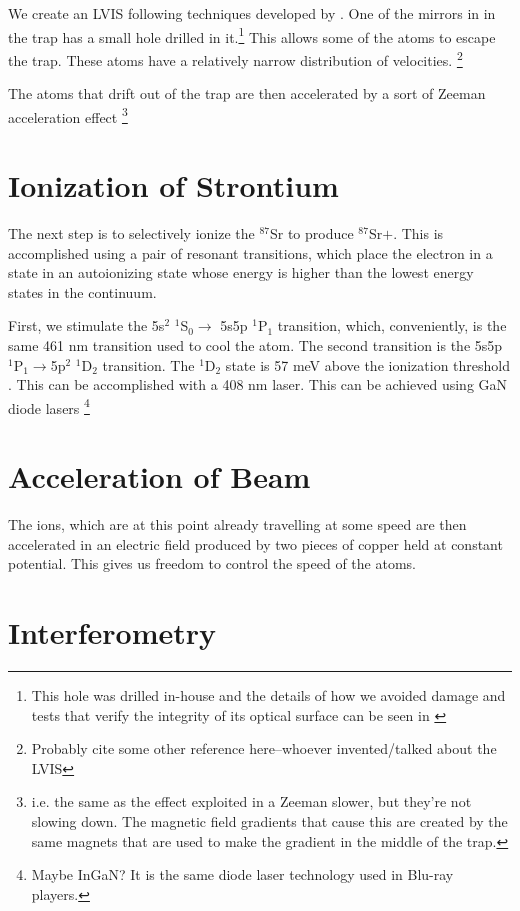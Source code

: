 We create an LVIS \cite{cjeDiss} following techniques developed by \cite{LVIS}. One of the mirrors in in the trap has a small hole drilled in it.\footnote{This hole was drilled in-house and the details of how we avoided damage and tests that verify the integrity of its optical surface can be seen in \cite{cjeDiss}} This allows some of the atoms to escape the trap. These atoms have a relatively narrow distribution of velocities. \footnote{Probably cite some other reference here--whoever invented/talked about the LVIS}

The atoms that drift out of the trap are then accelerated by a sort of Zeeman acceleration effect \footnote{i.e. the same as the effect exploited in a Zeeman slower, but they're not slowing down. The magnetic field gradients that cause this are created by the same magnets that are used to make the gradient in the middle of the trap.}

\section{Ionization of Strontium}
 
The next step is to selectively ionize the $^{87}$Sr to produce $^{87}$Sr$+$. This is accomplished using a pair of resonant transitions, which place the electron in a state in an autoionizing state whose energy is higher than the lowest energy states in the continuum. 

First, we stimulate the 5s$^2$ $^1$S$_0 \rightarrow$ 5s5p $^1$P$_1$ transition, which, conveniently, is the same 461 nm transition used to cool the atom. The second transition is the 5s5p $^1$P$_1\rightarrow$5p$^2$ $^1$D$_2$ transition. The $^1$D$_2$ state is 57 meV above the ionization threshold \cite{NSFprop}. This can be accomplished with a 408 nm laser. This can be achieved using GaN diode lasers \footnote{Maybe InGaN? It is the same diode laser technology used in Blu-ray players.}

\section{Acceleration of Beam}

The ions, which are at this point already travelling at some speed are then accelerated in an electric field produced by two pieces of copper held at constant potential. This gives us freedom to control the speed of the atoms. 


\section{Interferometry}

